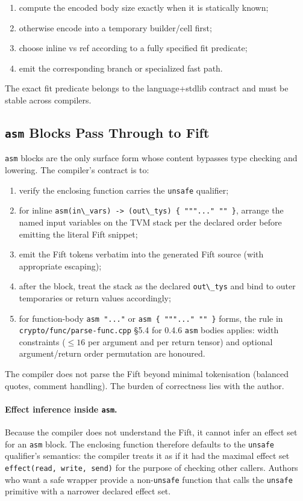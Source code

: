 \documentclass[12pt,oneside]{article}
\begin{document}
\begin{enumerate}
\item compute the encoded body size exactly when it is statically known;
\item otherwise encode into a temporary builder/cell first;
\item choose inline vs ref according to a fully specified fit predicate;
\item emit the corresponding branch or specialized fast path.
\end{enumerate}

The exact fit predicate belongs to the language+stdlib contract and
must be stable across compilers.

\subsection{\texttt{asm} Blocks Pass Through to Fift}
\label{sec:asm-lowering}
\verb|asm| blocks are the only surface form whose content bypasses
type checking and lowering. The compiler's contract is to:

\begin{enumerate}
\item verify the enclosing function carries the \verb|unsafe|
qualifier;
\item for inline \verb|asm(in\_vars) -> (out\_tys) { """..." "" }|,
arrange the named input variables on the TVM stack per the declared
order before emitting the literal Fift snippet;
\item emit the Fift tokens verbatim into the generated Fift source
(with appropriate escaping);
\item after the block, treat the stack as the declared \verb|out\_tys|
and bind to outer temporaries or return values accordingly;
\item for function-body \verb|asm "..."| or \verb|asm { """..." "" }|
forms, the rule in \verb|crypto/func/parse-func.cpp| \S5.4 for 0.4.6
\verb|asm| bodies applies: width constraints ($\le 16$ per argument
and per return tensor) and optional argument/return order permutation
are honoured.
\end{enumerate}

The compiler does not parse the Fift beyond minimal tokenisation
(balanced quotes, comment handling). The burden of correctness lies
with the author.

\paragraph{Effect inference inside \texttt{asm}.}
Because the compiler does not understand the Fift, it cannot infer an
effect set for an \verb|asm| block. The enclosing function therefore
defaults to the \verb|unsafe| qualifier's semantics: the compiler
treats it as if it had the maximal effect set
\verb|effect(read, write, send)| for the purpose of checking other
callers. Authors who want a safe wrapper provide a non-\verb|unsafe|
function that calls the \verb|unsafe| primitive with a narrower
declared effect set.
\end{document}
